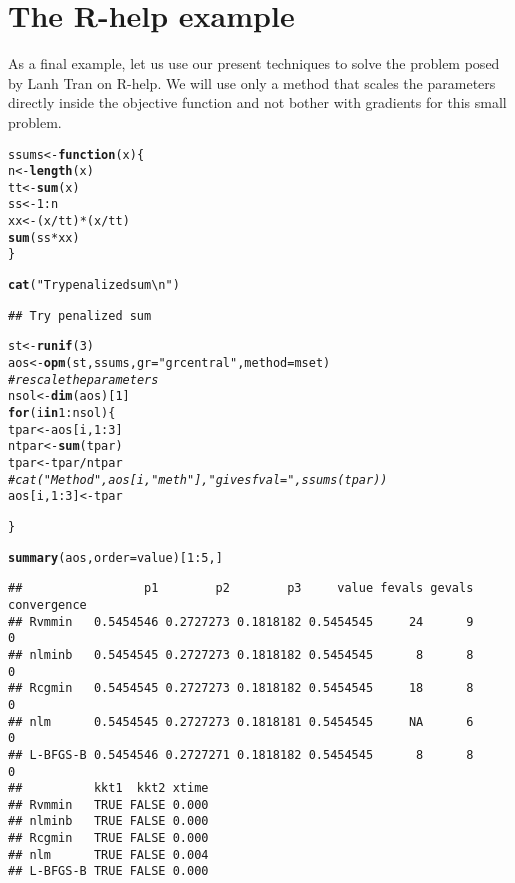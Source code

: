 \documentclass[11pt]{article}\usepackage[]{graphicx}\usepackage[]{color}
\makeatletter
\newcommand{\hlnum}[1]{\textcolor[rgb]{0.686,0.059,0.569}{#1}}%
\newcommand{\hlstr}[1]{\textcolor[rgb]{0.192,0.494,0.8}{#1}}%
\newcommand{\hlcom}[1]{\textcolor[rgb]{0.678,0.584,0.686}{\textit{#1}}}%
\newcommand{\hlopt}[1]{\textcolor[rgb]{0,0,0}{#1}}%
\newcommand{\hlstd}[1]{\textcolor[rgb]{0.345,0.345,0.345}{#1}}%
\newcommand{\hlkwa}[1]{\textcolor[rgb]{0.161,0.373,0.58}{\textbf{#1}}}%
\newcommand{\hlkwb}[1]{\textcolor[rgb]{0.69,0.353,0.396}{#1}}%
\newcommand{\hlkwc}[1]{\textcolor[rgb]{0.333,0.667,0.333}{#1}}%
\newcommand{\hlkwd}[1]{\textcolor[rgb]{0.737,0.353,0.396}{\textbf{#1}}}%
\newenvironment{kframe}{%
 \def\at@end@of@kframe{}%
 \ifinner\ifhmode%
  \def\at@end@of@kframe{\end{minipage}}%
  \begin{minipage}{\columnwidth}%
 \fi\fi%
 \def\FrameCommand##1{\hskip\@totalleftmargin \hskip-\fboxsep
 \colorbox{shadecolor}{##1}\hskip-\fboxsep
     \hskip-\linewidth \hskip-\@totalleftmargin \hskip\columnwidth}%
 \MakeFramed {\advance\hsize-\width
   \@totalleftmargin\z@ \linewidth\hsize
   \@setminipage}}%
 {\par\unskip\endMakeFramed%
 \at@end@of@kframe}
\newenvironment{knitrout}{}{} %
\makeatother
\begin{document}
\section{The R-help example}

As a final example, let us use our present techniques to solve the 
problem posed by Lanh Tran on R-help. We will use
only a method that scales the parameters directly inside the objective function and 
not bother with gradients for this small problem. 

\begin{knitrout}\scriptsize
{}\color{fgcolor}\begin{kframe}
\begin{alltt}
\hlstd{ssums}\hlkwb{<-}\hlkwa{function}\hlstd{(}\hlkwc{x}\hlstd{)\{}
  \hlstd{n}\hlkwb{<-}\hlkwd{length}\hlstd{(x)}
  \hlstd{tt}\hlkwb{<-}\hlkwd{sum}\hlstd{(x)}
  \hlstd{ss}\hlkwb{<-}\hlnum{1}\hlopt{:}\hlstd{n}
  \hlstd{xx}\hlkwb{<-}\hlstd{(x}\hlopt{/}\hlstd{tt)}\hlopt{*}\hlstd{(x}\hlopt{/}\hlstd{tt)}
  \hlkwd{sum}\hlstd{(ss}\hlopt{*}\hlstd{xx)}
\hlstd{\}}

\hlkwd{cat}\hlstd{(}\hlstr{"Try penalized sum\textbackslash{}n"}\hlstd{)}
\end{alltt}
\begin{verbatim}
## Try penalized sum
\end{verbatim}
\begin{alltt}
\hlstd{st}\hlkwb{<-}\hlkwd{runif}\hlstd{(}\hlnum{3}\hlstd{)}
\hlstd{aos}\hlkwb{<-}\hlkwd{opm}\hlstd{(st, ssums,} \hlkwc{gr}\hlstd{=}\hlstr{"grcentral"}\hlstd{,} \hlkwc{method}\hlstd{=mset)}
\hlcom{# rescale the parameters}
\hlstd{nsol}\hlkwb{<-}\hlkwd{dim}\hlstd{(aos)[}\hlnum{1}\hlstd{]}
\hlkwa{for} \hlstd{(i} \hlkwa{in} \hlnum{1}\hlopt{:}\hlstd{nsol)\{}
  \hlstd{tpar}\hlkwb{<-}\hlstd{aos[i,}\hlnum{1}\hlopt{:}\hlnum{3}\hlstd{]}
  \hlstd{ntpar}\hlkwb{<-}\hlkwd{sum}\hlstd{(tpar)}
  \hlstd{tpar}\hlkwb{<-}\hlstd{tpar}\hlopt{/}\hlstd{ntpar}
\hlcom{#  cat("Method ",aos[i, "meth"]," gives fval =", ssums(tpar))}
  \hlstd{aos[i,} \hlnum{1}\hlopt{:}\hlnum{3}\hlstd{]}\hlkwb{<-}\hlstd{tpar}

\hlstd{\}}

\hlkwd{summary}\hlstd{(aos,}\hlkwc{order}\hlstd{=value)[}\hlnum{1}\hlopt{:}\hlnum{5}\hlstd{,]}
\end{alltt}
\begin{verbatim}
##                 p1        p2        p3     value fevals gevals convergence
## Rvmmin   0.5454546 0.2727273 0.1818182 0.5454545     24      9           0
## nlminb   0.5454545 0.2727273 0.1818182 0.5454545      8      8           0
## Rcgmin   0.5454545 0.2727273 0.1818182 0.5454545     18      8           0
## nlm      0.5454545 0.2727273 0.1818181 0.5454545     NA      6           0
## L-BFGS-B 0.5454546 0.2727271 0.1818182 0.5454545      8      8           0
##          kkt1  kkt2 xtime
## Rvmmin   TRUE FALSE 0.000
## nlminb   TRUE FALSE 0.000
## Rcgmin   TRUE FALSE 0.000
## nlm      TRUE FALSE 0.004
## L-BFGS-B TRUE FALSE 0.000
\end{verbatim}
\end{kframe}
\end{knitrout}
\end{document}
